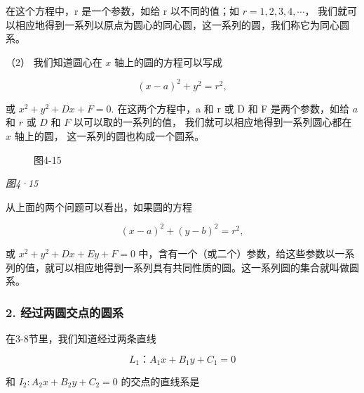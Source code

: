 在这个方程中，r 是一个参数，如给 r 以不同的值；如 \(r=1,2,3,4,\cdots\)，
我们就可以相应地得到一系列以原点为圆心的同心圆，这一系列的圆，我们称它为同心圆系。

（2） 我们知道圆心在 \(x\) 轴上的圆的方程可以写成

\[
(x - a) ^ {2} + y^{2} = r^{2},
\]

或 \(x^{2} + y^{2} + Dx + F = 0.\) 在这两个方程中，a 和 r 或 D 和 F
是两个参数，如给 \(a\) 和 \(r\) 或 \(D\) 和 \(F\) 以可以取的一系列的值，
我们就可以相应地得到一系列圆心都在 \(x\) 轴上的圆，
这一系列的圆也构成一个圆系。

\begin{figure}
\centering
{}
\caption{图4-15}
\end{figure}

\emph{图4·15}

从上面的两个问题可以看出，如果圆的方程

\[
(x - a) ^ {2} + (y - b) ^ {2} = r^{2},
\]

或 \(x^{2} + y^{2} + Dx + Ey + F = 0\)
中，含有一个（或二个）参数，给这些参数以一系列的值，就可以相应地得到一系列具有共同性质的圆。这一系列圆的集合就叫做圆系。

\subsubsection{2.
经过两圆交点的圆系}\label{ux7ecfux8fc7ux4e24ux5706ux4ea4ux70b9ux7684ux5706ux7cfb}

在3-8节里，我们知道经过两条直线

\[
L_{1}\text{：} A_{1} x + B_{1} y + C_{1} = 0
\]

和 \(I_{2}: A_{2}x + B_{2}y + C_{2} = 0\) 的交点的直线系是

